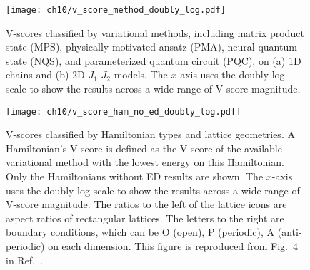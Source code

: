 \begin{figure}[htb]
\centering
\texttt{[image: ch10/v\_score\_method\_doubly\_log.pdf]}
\caption[V-scores of different methods]{
V-scores classified by variational methods, including matrix product state (MPS), physically motivated ansatz (PMA), neural quantum state (NQS), and parameterized quantum circuit (PQC), on (a) 1D chains and (b) 2D $J_1$-$J_2$ models.
The $x$-axis uses the doubly log scale to show the results across a wide range of V-score magnitude.
}
\label{fig:v-score-method}
\end{figure}

\begin{figure}[htb]
\centering
\texttt{[image: ch10/v\_score\_ham\_no\_ed\_doubly\_log.pdf]}
\caption[V-scores of different Hamiltonians]{
V-scores classified by Hamiltonian types and lattice geometries.
A Hamiltonian's V-score is defined as the V-score of the available variational method with the lowest energy on this Hamiltonian.
Only the Hamiltonians without ED results are shown.
The $x$-axis uses the doubly log scale to show the results across a wide range of V-score magnitude.
The ratios to the left of the lattice icons are aspect ratios of rectangular lattices. The letters to the right are boundary conditions, which can be O (open), P (periodic), A (anti-periodic) on each dimension.
This figure is reproduced from Fig.~4 in Ref.~\cite{wu2023variational}.
}
\label{fig:v-score-ham}
\end{figure}
